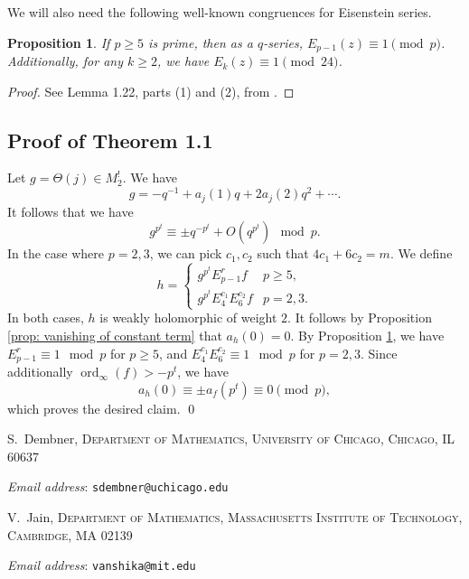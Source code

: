 \documentclass[11pt]{article}
\makeatletter
\newtheorem{proposition}[theorem]{Proposition}
\theoremstyle{definition}
\numberwithin{equation}{subsection}
\DeclareMathOperator{\ord}{ord}
\newcommand{\Addresses}{{%
  \bigskip
  \footnotesize

  \noindent S.~Dembner, \textsc{Department of Mathematics, University of Chicago, Chicago, IL 60637}\par\nopagebreak
  \textit{Email address}: \texttt{sdembner@uchicago.edu}

  \medskip

  \noindent V.~Jain, \textsc{Department of Mathematics, Massachusetts Institute of Technology, Cambridge, MA 02139}\par\nopagebreak
  \textit{Email address}: \texttt{vanshika@mit.edu}

}}
\makeatother
\begin{document}
We will also need the following well-known congruences for Eisenstein series.

\begin{proposition}\label{prop: congruence for eisenstein series}
If $p \geq 5$ is prime, then as a $q$-series, $E_{p-1}(z) \equiv 1 \pmod p$. Additionally, for any $k \geq 2$, we have $E_k(z) \equiv 1 \pmod{24}$.
\end{proposition}

\begin{proof}
See Lemma 1.22, parts (1) and (2), from \cite{Ono2004web}. \qedhere
\end{proof}


\subsection{Proof of Theorem 1.1} \label{subsec: proof of main thm}

Let $g = \Theta(j) \in M_2^{!}$. We have
$$ g = - q^{-1} + a_j(1) q + 2 a_j(2) q^2 + \cdots.   $$
It follows that we have
$$ g^{p^t} \equiv \pm q^{- p^t} + O(q^{p^t}) \mod p. $$
In the case where $p = 2, 3$, we can pick $c_1, c_2$ such that $4 c_1 + 6 c_2 = m$. We define
$$ h = \begin{cases} g^{p^t} E_{p-1}^r f & p \geq 5, \\ g^{p^t} E_4^{c_1} E_6^{c_2} f & p = 2 ,3. \end{cases} $$
In both cases, $h$ is weakly holomorphic of weight $2$. It follows by Proposition \ref{prop: vanishing of constant term} that $a_h(0) = 0$. By Proposition  \ref{prop: congruence for eisenstein series}, we have $E_{p-1}^r \equiv 1 \mod p$ for $p \geq 5$, and $E_4^{c_1} E_6^{c_2} \equiv 1 \mod p$ for $p = 2,3$. Since additionally $\ord_{\infty}(f) > - p^t$, we have
$$a_h(0) \equiv \pm a_f(p^t) \equiv 0 \pmod p,$$
which proves the desired claim. \qed

\printbibliography

\Addresses
\end{document}
